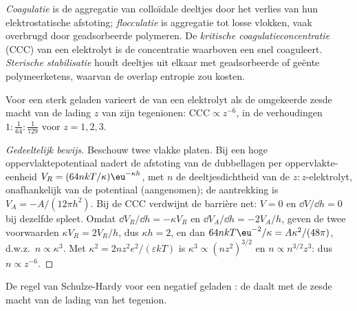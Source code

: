 \begin{definition}\label{def:b3:colloids:stability}
\emph{Coagulatie} is de aggregatie van colloïdale
deeltjes door het verlies van hun elektrostatische afstoting;
\emph{flocculatie}
is aggregatie tot losse vlokken, vaak overbrugd door geadsorbeerde
polymeren. De
\emph{kritische coagulatieconcentratie}
(CCC) van een elektrolyt is de concentratie waarboven een  snel
coaguleert. \emph{Sterische stabilisatie}
houdt deeltjes uit elkaar met geadsorbeerde of geënte polymeerketens,
waarvan de overlap entropie zou kosten.
\end{definition}

\begin{proposition}\label{prop:b3:colloids:schulze-hardy}
Voor een sterk geladen  varieert de  van een elektrolyt als de omgekeerde zesde macht
van de lading $z$ van zijn
tegenionen: $\text{CCC} \propto z^{-6}$, in de verhoudingen $1 : \frac{1}{64} : \frac{1}{729}$ voor $z = 1, 2, 3$.
\end{proposition}

\begin{proof}[Gedeeltelijk bewijs]
Beschouw twee vlakke platen. Bij een hoge oppervlaktepotentiaal nadert de
afstoting van de dubbellagen per oppervlakte-eenheid $V_R = (64nkT/\kappa)\eu^{-\kappa h}$, met $n$ de deeltjesdichtheid van de $z{:}z$-elektrolyt,
onafhankelijk van de potentiaal (aangenomen); de aantrekking is $V_A =
-A/(12\pi h^2)$. Bij de CCC verdwijnt de barrière net: $V = 0$ en $\dd V/\dd h = 0$ bij dezelfde
spleet. Omdat $\dd V_R/\dd h = -\kappa V_R$ en $\dd V_A/\dd h = -2V_A/h$, geven de twee voorwaarden
$\kappa V_R = 2V_R/h$, dus $\kappa h = 2$, en dan $64nkT\eu^{-2}/\kappa = A\kappa^2/(48\pi)$, d.w.z.\ $n \propto \kappa^3$. Met
$\kappa^2 = 2nz^2e^2/(\varepsilon kT)$ is $\kappa^3 \propto (nz^2)^{3/2}$ en $n \propto n^{3/2}z^3$: dus $n \propto z^{-6}$.
\end{proof}

\begin{omfigure}

{\small De regel van Schulze-Hardy voor een negatief geladen : de
 daalt met de zesde macht van de lading
van het tegenion.}
\end{omfigure}

